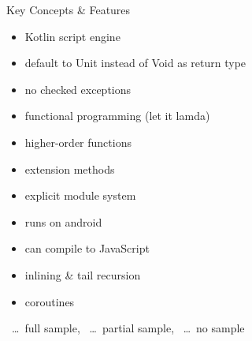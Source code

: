 \begin{frame}{Key Concepts \& Features}
	\begin{itemize}
		\item Kotlin script engine \xmark 
		\item default to Unit instead of Void as return type \xmark 
		\item no checked exceptions \xmark
		\item functional programming (let it lamda) \tmark
		\item higher-order functions \tmark
		\item extension methods \cmark
		\item explicit module system \xmark
		\item runs on android \xmark
		\item can compile to JavaScript \xmark
		\item inlining \& tail recursion \xmark
		\item coroutines \tmark
	\end{itemize}
\cmark\ \dots\ full sample, \tmark\ \dots\ partial sample, \xmark\ \dots\ no sample
\end{frame}

